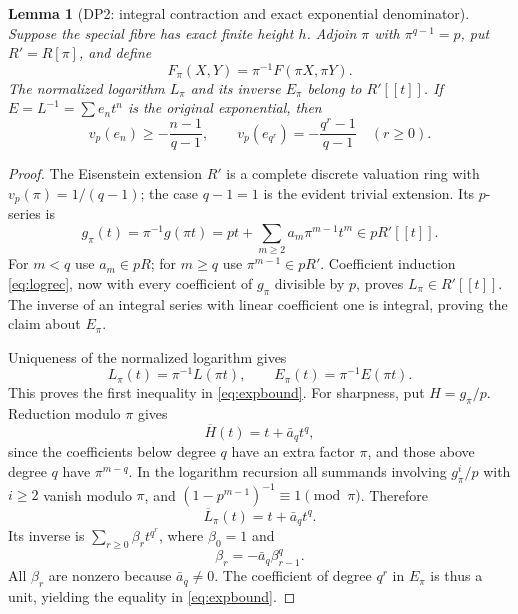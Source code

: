 \documentclass[11pt,a4paper]{article}
\newtheorem{lemma}[theorem]{Lemma}
\theoremstyle{definition}\newtheorem{remark}[theorem]{Remark}
\newcommand{\vp}{v_p}\newcommand{\dR}{\mathrm{dR}}\newcommand{\crys}{\mathrm{crys}}
\begin{document}
\begin{lemma}[DP2: integral contraction and exact exponential denominator]\label{DP2}
Suppose the special fibre has exact finite height $h$. Adjoin $\pi$ with $\pi^{q-1}=p$, put $R'=R[\pi]$, and define
\[
 F_\pi(X,Y)=\pi^{-1}F(\pi X,\pi Y).
\]
The normalized logarithm $L_\pi$ and its inverse $E_\pi$ belong to $R'[[t]]$. If $E=L^{-1}=\sum e_nt^n$ is the original exponential, then
\begin{equation}\label{eq:expbound}
 \vp(e_n)\ge-\frac{n-1}{q-1},\qquad
 \vp(e_{q^r})=-\frac{q^r-1}{q-1}\quad(r\ge0).
\end{equation}
\end{lemma}
\begin{proof}
The Eisenstein extension $R'$ is a complete discrete valuation ring with $\vp(\pi)=1/(q-1)$; the case $q-1=1$ is the evident trivial extension. Its $p$-series is
\[
 g_\pi(t)=\pi^{-1}g(\pi t)
 =pt+\sum_{m\ge2}a_m\pi^{m-1}t^m\in pR'[[t]].
\]
For $m<q$ use $a_m\in pR$; for $m\ge q$ use $\pi^{m-1}\in pR'$. Coefficient induction \eqref{eq:logrec}, now with every coefficient of $g_\pi$ divisible by $p$, proves $L_\pi\in R'[[t]]$. The inverse of an integral series with linear coefficient one is integral, proving the claim about $E_\pi$.

Uniqueness of the normalized logarithm gives
\[
 L_\pi(t)=\pi^{-1}L(\pi t),\qquad E_\pi(t)=\pi^{-1}E(\pi t).
\]
This proves the first inequality in \eqref{eq:expbound}. For sharpness, put $H=g_\pi/p$. Reduction modulo $\pi$ gives
\[
 \overline H(t)=t+\bar a_q t^q,
\]
since the coefficients below degree $q$ have an extra factor $\pi$, and those above degree $q$ have $\pi^{m-q}$. In the logarithm recursion all summands involving $g_\pi^i/p$ with $i\ge2$ vanish modulo $\pi$, and $(1-p^{m-1})^{-1}\equiv1\pmod\pi$. Therefore
\[
 \overline L_\pi(t)=t+\bar a_qt^q.
\]
Its inverse is $\sum_{r\ge0}\beta_rt^{q^r}$, where $\beta_0=1$ and
\[
 \beta_r=-\bar a_q\beta_{r-1}^{q}.
\]
All $\beta_r$ are nonzero because $\bar a_q\ne0$. The coefficient of degree $q^r$ in $E_\pi$ is thus a unit, yielding the equality in \eqref{eq:expbound}.
\end{proof}
\end{document}
